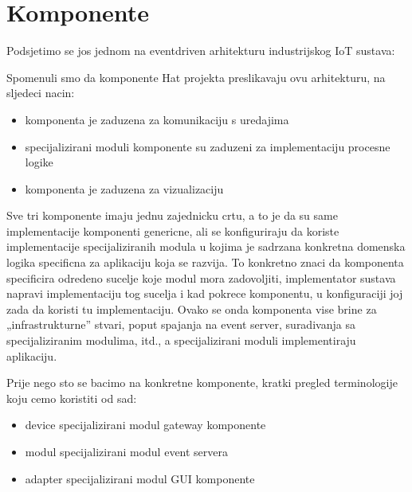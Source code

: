 \documentclass[letterpaper,10pt,croatian]{sphinxmanual}
\begin{document}
\section{Komponente}
\label{\detokenize{hat/components:komponente}}\label{\detokenize{hat/components::doc}}
\sphinxAtStartPar
Podsjetimo se jos jednom na event\sphinxhyphen{}driven arhitekturu industrijskog IoT sustava:

\sphinxAtStartPar
Spomenuli smo da komponente Hat projekta preslikavaju ovu arhitekturu, na
sljedeci nacin:
\begin{itemize}
\item {} 
\sphinxAtStartPar
{} komponenta je zaduzena za
komunikaciju s uredajima

\item {} 
\sphinxAtStartPar
specijalizirani moduli 
komponente su zaduzeni za implementaciju procesne logike

\item {} 
\sphinxAtStartPar
{} komponenta je zaduzena za
vizualizaciju

\end{itemize}

\sphinxAtStartPar
Sve tri komponente imaju jednu zajednicku crtu, a to je da su same
implementacije komponenti genericne, ali se konfiguriraju da koriste
implementacije specijaliziranih modula u kojima je sadrzana konkretna domenska
logika specificna za aplikaciju koja se razvija. To konkretno znaci da
komponenta specificira odredeno sucelje koje modul mora zadovoljiti,
implementator sustava napravi implementaciju tog sucelja i kad pokrece
komponentu, u konfiguraciji joj zada da koristi tu implementaciju. Ovako se
onda komponenta vise brine za „infrastrukturne” stvari, poput spajanja na event
server, suradivanja sa specijaliziranim modulima, itd., a specijalizirani
moduli implementiraju aplikaciju.

\sphinxAtStartPar
Prije nego sto se bacimo na konkretne komponente, kratki pregled terminologije
koju cemo koristiti od sad:
\begin{itemize}
\item {} 
\sphinxAtStartPar
device \sphinxhyphen{} specijalizirani modul gateway komponente

\item {} 
\sphinxAtStartPar
modul \sphinxhyphen{} specijalizirani modul event servera

\item {} 
\sphinxAtStartPar
adapter \sphinxhyphen{} specijalizirani modul GUI komponente

\end{itemize}
\end{document}
